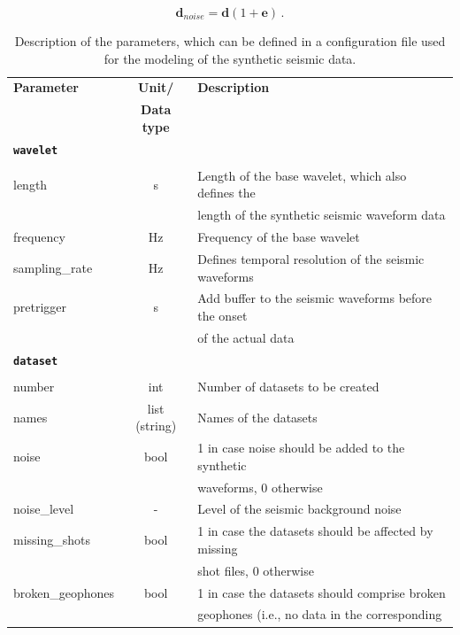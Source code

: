 \documentclass[a4paper,fleqn]{cas-sc}
\newcommand{\vecmat}[1]{\bm #1}
\begin{document}
\begin{equation}
	\vecmat{d_{noise}}=\vecmat{d}\left(1 + \vecmat{e}\right)\,.
	\label{eq:noisydata}
\end{equation}

\begin{table}[]
    \caption{Description of the parameters, which can be defined in a configuration file used for the modeling of the synthetic seismic data.}
    \centering
    \begin{tabular*}{\tblwidth}{@{} LCL@{}}
        \toprule
        \textbf{Parameter} & \textbf{Unit/} & \textbf{Description} \\
         & \textbf{Data type} & \\ 
        \midrule
        \textbf{\texttt{wavelet}} & & \\
         & & \\
        length & s & Length of the base wavelet, which also defines the \\
         & & length of the synthetic seismic waveform data \\ 
        frequency & Hz & Frequency of the base wavelet \\ 
        sampling\_rate & Hz & Defines temporal resolution of the seismic waveforms \\ 
        pretrigger & s & Add buffer to the seismic waveforms before the onset \\
         & & of the actual data \\
        \midrule
        \textbf{\texttt{dataset}} & & \\
         & & \\
        number & int & Number of datasets to be created \\
        names & list (string) & Names of the datasets \\
        noise & bool & 1 in case noise should be added to the synthetic \\
         & & waveforms, 0 otherwise \\
        noise\_level & - & Level of the seismic background noise \\
        missing\_shots & bool & 1 in case the datasets should be affected by missing \\
         & & shot files, 0 otherwise \\
        broken\_geophones & bool & 1 in case the datasets should comprise broken \\
         & & geophones (i.e., no data in the corresponding \\

\end{tabular*}
\end{table}
\end{document}
